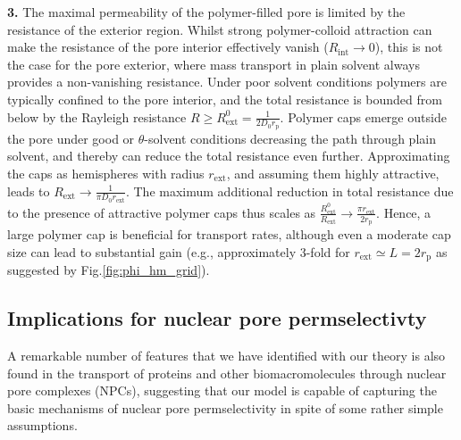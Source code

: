 \documentclass[12pt, a4paper]{article}
\begin{document}
\textbf{3.}
The maximal permeability of the polymer-filled pore is limited by the resistance of the exterior region.
Whilst strong  polymer-colloid attraction can make the resistance of the pore interior effectively vanish ($R_{\text{int}} \to 0$), this is not the case for the pore exterior, where mass transport in plain solvent always provides a non-vanishing resistance.
Under poor solvent conditions  polymers are typically confined to the pore interior, and the total resistance is bounded from below by the Rayleigh resistance  $R \geq R_{\text{ext}}^{0} = \frac{1}{2 D_0 r_{\text{p}}}$.
Polymer caps emerge outside the pore under good or $\theta$-solvent conditions decreasing the path through plain solvent, and thereby can reduce the total resistance even further. Approximating the caps as hemispheres with radius $r_{\text{ext}}$, and assuming them highly attractive, leads to $R_{\text{ext}} \to \frac{1}{ \pi D_0 r_{\text{ext}}}$.
The maximum additional reduction in total resistance due to the presence of attractive polymer caps thus scales as $\frac{R_{\text{ext}}^{0}}{R_{\text{ext}}} \to \frac{\pi r_{\text{ext}}}{2 r_{\text{p}}}$.
Hence, a large polymer cap is beneficial for transport rates, although even a moderate cap size can lead to substantial gain (e.g., approximately 3-fold for $r_{\text{ext}}\simeq L = 2r_{\text{p}}$ as suggested by Fig.\ref{fig:phi_hm_grid}).

\bigskip



\subsection{Implications for nuclear pore permselectivty}

A remarkable number of features that we have identified with our theory is also found in the transport of proteins and other biomacromolecules through nuclear pore complexes (NPCs), suggesting that our model is capable of capturing the basic mechanisms of nuclear pore permselectivity in spite of some rather simple assumptions.
\end{document}
